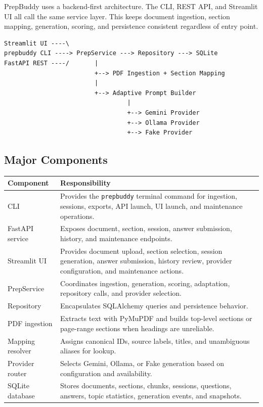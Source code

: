 \documentclass[11pt]{article}
\begin{document}
PrepBuddy uses a backend-first architecture. The CLI, REST API, and Streamlit UI all call the same service layer. This keeps document ingestion, section mapping, generation, scoring, and persistence consistent regardless of entry point.

\begin{verbatim}
Streamlit UI ----\
prepbuddy CLI ----> PrepService ---> Repository ---> SQLite
FastAPI REST ----/       |
                         +--> PDF Ingestion + Section Mapping
                         |
                         +--> Adaptive Prompt Builder
                                  |
                                  +--> Gemini Provider
                                  +--> Ollama Provider
                                  +--> Fake Provider
\end{verbatim}

\subsection{Major Components}

\begin{longtable}{p{}p{}}
\toprule
\textbf{Component} & \textbf{Responsibility} \\
\midrule
CLI & Provides the \texttt{prepbuddy} terminal command for ingestion, sessions, exports, API launch, UI launch, and maintenance operations. \\
FastAPI service & Exposes document, section, session, answer submission, history, and maintenance endpoints. \\
Streamlit UI & Provides document upload, section selection, session generation, answer submission, history review, provider configuration, and maintenance actions. \\
PrepService & Coordinates ingestion, generation, scoring, adaptation, repository calls, and provider selection. \\
Repository & Encapsulates SQLAlchemy queries and persistence behavior. \\
PDF ingestion & Extracts text with PyMuPDF and builds top-level sections or page-range sections when headings are unreliable. \\
Mapping resolver & Assigns canonical IDs, source labels, titles, and unambiguous aliases for lookup. \\
Provider router & Selects Gemini, Ollama, or Fake generation based on configuration and availability. \\
SQLite database & Stores documents, sections, chunks, sessions, questions, answers, topic statistics, generation events, and snapshots. \\
\bottomrule
\end{longtable}
\end{document}

